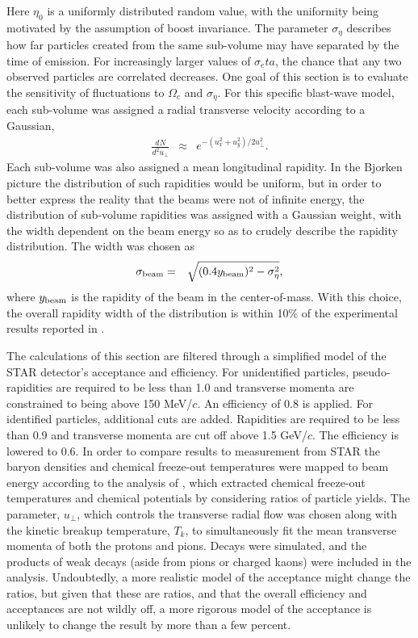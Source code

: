 Here $\eta_0$ is a uniformly distributed random value, with the uniformity being motivated by the assumption of boost invariance. The parameter $\sigma_\eta$ describes how far particles created from the same sub-volume may have separated by the time of emission. For increasingly larger values of $\sigma_eta$, the chance that any two observed particles are correlated decreases.  One goal of this section is to evaluate the sensitivity of fluctuations to $\Omega_c$ and $\sigma_\eta$. For this specific blast-wave model, each sub-volume was assigned a radial transverse velocity according to a Gaussian,
\begin{eqnarray}
\frac{dN}{d^2u_\perp}&\approx&e^{-(u_x^2+u_y^2)/2u_\perp^2}.
\end{eqnarray}
Each sub-volume was also assigned a mean longitudinal rapidity. In the Bjorken picture the distribution of such rapidities would be uniform, but in order to better express the reality that the beams were not of infinite energy, the distribution of sub-volume rapidities was assigned with a Gaussian weight, with the width dependent on the beam energy so as to crudely describe the rapidity distribution. The width was chosen as 
\begin{eqnarray}
\sigma_{\rm beam}&=&\sqrt{(0.4y_{\rm beam})^2-\sigma_\eta^2},
\end{eqnarray}
where $y_{\rm beam}$ is the rapidity of the beam in the center-of-mass. With this choice, the overall rapidity width of the distribution is within 10\% of the experimental results reported in \cite{Flores:2016mtp}.

The calculations of this section are filtered through a simplified model of the STAR detector's acceptance and efficiency. For unidentified particles, pseudo-rapidities are required to be less than 1.0 and transverse momenta are constrained to being above 150 MeV/$c$. An efficiency of 0.8 is applied. For identified particles, additional cuts are added. Rapidities are required to be less than 0.9 and transverse momenta are cut off above 1.5 GeV/$c$. The efficiency is lowered to 0.6. In order to compare results to measurement from STAR the baryon densities and chemical freeze-out temperatures were mapped to beam energy according to the analysis of \cite{....}, which extracted chemical freeze-out temperatures and chemical potentials by considering ratios of particle yields. The parameter, $u_\perp$, which controls the transverse radial flow was chosen along with the kinetic breakup temperature, $T_k$, to simultaneously fit the mean transverse momenta of both the protons and pions. Decays were simulated, and the products of weak decays (aside from pions or charged kaons) were included in the analysis. Undoubtedly, a more realistic model of the acceptance might change the ratios, but given that these are ratios, and that the overall efficiency and acceptances are not wildly off, a more rigorous model of the acceptance is unlikely to change the result by more than a few percent.

